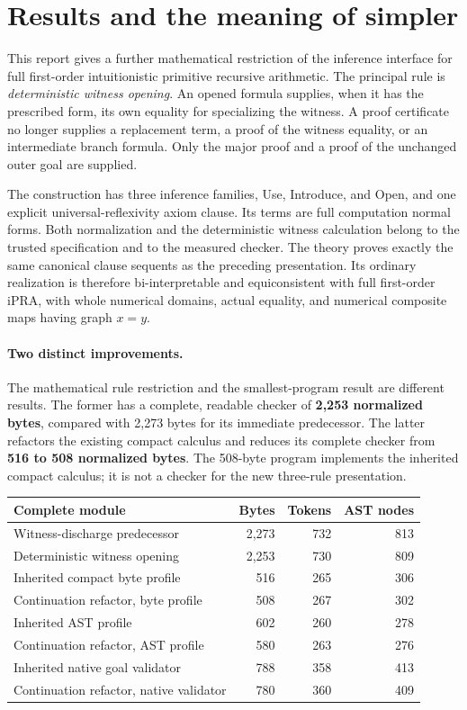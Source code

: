 \section{Results and the meaning of simpler}
\label{sec:results}

This report gives a further mathematical restriction of the inference
interface for full first-order intuitionistic primitive recursive arithmetic.
The principal rule is \emph{deterministic witness opening}.  An opened
formula supplies, when it has the prescribed form, its own equality for
specializing the witness.  A proof certificate no longer supplies a replacement
term, a proof of the witness equality, or an intermediate branch formula.
Only the major proof and a proof of the unchanged outer goal are supplied.

The construction has three inference families, Use, Introduce, and Open,
and one explicit universal-reflexivity axiom clause.  Its terms are full
computation normal forms.  Both normalization and the deterministic witness
calculation belong to the trusted specification and to the measured checker.
The theory proves exactly the same canonical clause sequents as the preceding
presentation.  Its ordinary realization is therefore bi-interpretable and
equiconsistent with full first-order iPRA, with whole numerical domains,
actual equality, and numerical composite maps having graph $x=y$.

\paragraph{Two distinct improvements.}
The mathematical rule restriction and the smallest-program result are
different results.  The former has a complete, readable checker of
\textbf{2,253 normalized bytes}, compared with 2,273 bytes for its immediate
predecessor.  The latter refactors the existing compact calculus and reduces
its complete checker from \textbf{516 to 508 normalized bytes}.  The 508-byte
program implements the inherited compact calculus; it is not a checker for
the new three-rule presentation.

\begin{center}
\begin{tabular}{lrrr}
\toprule
Complete module & Bytes & Tokens & AST nodes\\
\midrule
Witness-discharge predecessor & 2,273 & 732 & 813\\
Deterministic witness opening & 2,253 & 730 & 809\\
\midrule
Inherited compact byte profile & 516 & 265 & 306\\
Continuation refactor, byte profile & 508 & 267 & 302\\
Inherited AST profile & 602 & 260 & 278\\
Continuation refactor, AST profile & 580 & 263 & 276\\
Inherited native goal validator & 788 & 358 & 413\\
Continuation refactor, native validator & 780 & 360 & 409\\
\bottomrule
\end{tabular}
\end{center}

